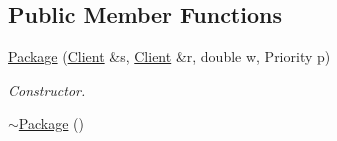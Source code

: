 \subsection*{Public Member Functions}
\begin{DoxyCompactItemize}
\item 
\hyperlink{classPackage_af450657156caeed9e52191dab9d81af9}{Package} (\hyperlink{classClient}{Client} \&s, \hyperlink{classClient}{Client} \&r, double w, Priority p)
\begin{DoxyCompactList}\small\item\em Constructor. \end{DoxyCompactList}\item 
\hyperlink{classPackage_af9b48c577bb6045c2cbc97d09f76e973}{$\sim$\+Package} ()\hypertarget{classPackage_af9b48c577bb6045c2cbc97d09f76e973}{}\label{classPackage_af9b48c577bb6045c2cbc97d09f76e973}


\end{DoxyCompactItemize}
